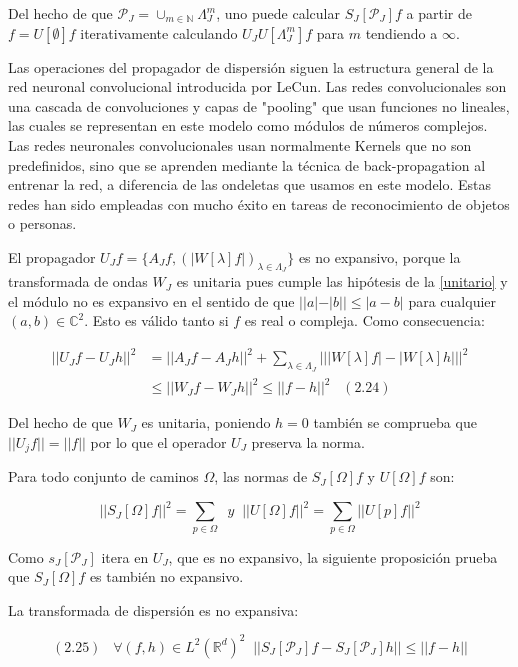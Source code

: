 \noindent Del hecho de que $\mathcal{P}_J=\cup_{m\in \mathbb{N}}\Lambda_J^m$, uno puede calcular $S_J[\mathcal{P}_J]f$ a partir de $f=U[\emptyset]f$ iterativamente calculando $U_J U[\Lambda_J^m]f$ para $m$ tendiendo a $\infty$. 

Las operaciones del propagador de dispersión siguen la estructura general de la red neuronal convolucional introducida por LeCun. Las redes convolucionales son una cascada de convoluciones y capas de "pooling" que usan funciones no lineales, las cuales se representan en este modelo como módulos de números complejos. Las redes neuronales convolucionales usan normalmente Kernels que no son predefinidos, sino que se aprenden mediante la técnica de back-propagation al entrenar la red, a diferencia de las ondeletas que usamos en este modelo. Estas redes han sido empleadas con mucho éxito en tareas de reconocimiento de objetos o personas.

\noindent El propagador $U_Jf=\lbrace A_Jf, \left(\left| W[\lambda]f\right|\right)_{\lambda\in\Lambda_J} \rbrace$ es no expansivo, porque la transformada de ondas $W_J$ es unitaria pues cumple las hipótesis de la \autoref{unitario} y el módulo no es expansivo en el sentido de que $||a|-|b||\leq |a-b|$ para cualquier $(a,b)\in \mathbb{C}^2$. Esto es válido tanto si $f$ es real o compleja. Como consecuencia: 

\begin{align*} 
    ||U_J f-U_J h||^2 &= ||A_J f-A_J h||^2+\sum_{\lambda\in\Lambda_J} \left| \left| |W[\lambda]f|-|W[\lambda]h| \right| \right|^2 \\
    &\leq \left| \left| W_J f- W_J h \right| \right|^2 \leq ||f-h||^2 \;\;\; (2.24)
\end{align*}

\noindent Del hecho de que $W_J$ es unitaria, poniendo $h=0$ también se comprueba que $||U_j f||=||f||$ por lo que el operador $U_J$ preserva la norma.

\medskip

\noindent Para todo conjunto de caminos $\Omega$, las normas de $S_J[\Omega]f$ y $U[\Omega]f$ son: 

$$\left|\left| S_J[\Omega]f \right|\right|^2=\sum_{p\in\Omega} \;\; y \;\; \left|\left|U[\Omega]f\right|\right|^2=\sum_{p\in\Omega} \left|\left| U[p]f\right|\right|^2$$

\noindent Como $s_J[\mathcal{P}_J]$ itera en $U_J$, que es no expansivo, la siguiente proposición prueba que $S_J[\Omega]f$ es también no expansivo. 

\begin{proposicion}
La transformada de dispersión es no expansiva: 

$$(2.25) \;\;\; \forall (f,h)\in L^2(\mathbb{R}^d)^2 \;\; ||S_J[\mathcal{P}_J]f-S_J[\mathcal{P}_J]h|| \leq ||f-h||$$
\end{proposicion}

